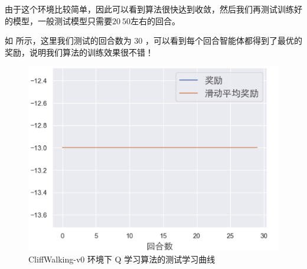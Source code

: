由于这个环境比较简单，因此可以看到算法很快达到收敛，然后我们再测试训练好的模型，一般测试模型只需要$20~50$左右的回合。

如 所示，这里我们测试的回合数为 30 ，可以看到每个回合智能体都得到了最优的奖励，说明我们算法的训练效果很不错！

\begin{figure}[htb]
    \centering
    \includegraphics[width=0.5\linewidth]{res/ch3/assets/eval_rewards_curve_cn}
    \caption{CliffWalking-v0 环境下 Q 学习算法的测试学习曲线}
    \label{fig:eval_rewards_curve_cn}
\end{figure}
